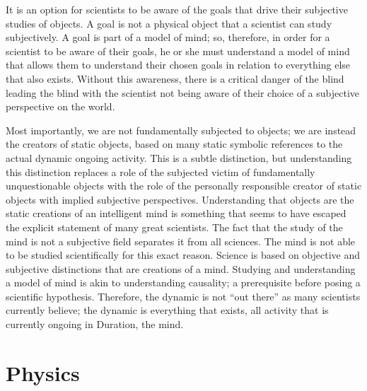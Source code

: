 It is an option for scientists to be aware of the goals that drive
their subjective studies of objects.  A goal is not a physical object
that a scientist can study subjectively.  A goal is part of a model of
mind; so, therefore, in order for a scientist to be aware of their
goals, he or she must understand a model of mind that allows them to
understand their chosen goals in relation to everything else that also
exists.  Without this awareness, there is a critical danger of the
blind leading the blind with the scientist not being aware of their
choice of a subjective perspective on the world.

  Most
importantly, we are not fundamentally subjected to objects; we are
instead the creators of static objects, based on many static symbolic
references to the actual dynamic ongoing activity.  This is a subtle
distinction, but understanding this distinction replaces a role of the
subjected victim of fundamentally unquestionable objects with the role
of the personally responsible creator of static objects with implied
subjective perspectives.  Understanding that objects are the static
creations of an intelligent mind is something that seems to have
escaped the explicit statement of many great scientists.  The fact
that the study of the mind is not a subjective field separates it from
all sciences.  The mind is not able to be studied scientifically for
this exact reason.  Science is based on objective and subjective
distinctions that are creations of a mind.  Studying and understanding
a model of mind is akin to understanding causality; a prerequisite
before posing a scientific hypothesis.  Therefore, the dynamic is not
``out there'' as many scientists currently believe; the dynamic is
everything that exists, all activity that is currently ongoing in
Duration, the mind.

\section{Physics}

